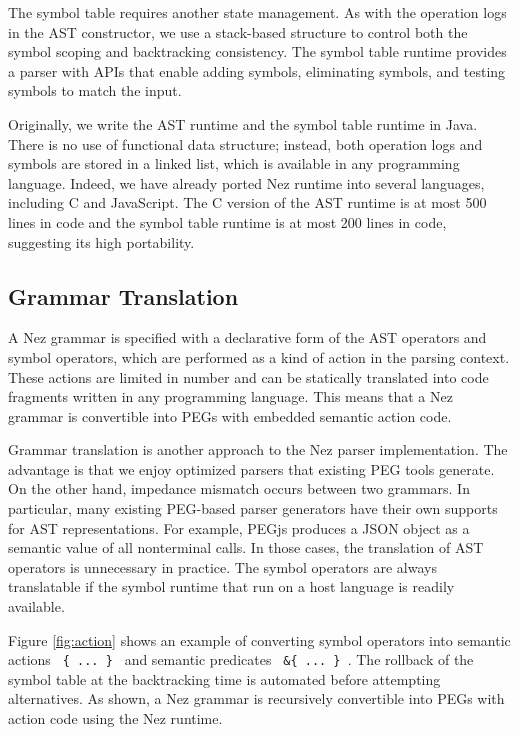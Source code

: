 \documentclass[preprint]{sigplanconf}
\begin{document}
{{{The symbol table requires another state management. As with the operation logs in the AST constructor, we use a stack-based structure to control both the symbol scoping and backtracking consistency. The symbol table runtime provides a parser with APIs that enable adding symbols, eliminating symbols, and testing symbols to match the input.

Originally, we write the AST runtime and the symbol table runtime in Java. There is no use of functional data structure; instead, both operation logs and symbols are stored in a linked list, which is available in any programming language. Indeed, we have already ported Nez runtime into several languages, including C and JavaScript. The C version of the AST runtime is at most 500 lines in code and the symbol table runtime is at most 200 lines in code, suggesting its high portability. 

\subsection{Grammar Translation}

A Nez grammar is specified with a declarative form of the AST operators and symbol operators, which are performed as a kind of action in the parsing context. These actions are limited in number and can be statically translated into code fragments written in any programming language. This means that a Nez grammar is convertible into PEGs 
with embedded semantic action code.  

Grammar translation is another approach to the Nez parser implementation. The advantage is that we enjoy optimized parsers that existing PEG tools generate.  On the other hand, impedance mismatch occurs between two grammars. In particular, many existing PEG-based parser generators have their own supports for AST representations. For example, PEGjs\cite{PEGjs} produces a JSON object as a semantic value of all nonterminal calls. In those cases, the translation of AST operators is unnecessary in practice. The symbol operators are always translatable if the symbol runtime that run on a host language is readily available.  

Figure \ref{fig:action} shows an example of converting symbol operators into  semantic actions \verb| { ... } | and semantic predicates \verb| &{ ... } |. The rollback of the symbol table at the backtracking time is automated before attempting alternatives. As shown, a Nez grammar is recursively convertible into PEGs with action code using the Nez runtime.

}}}
\end{document}
